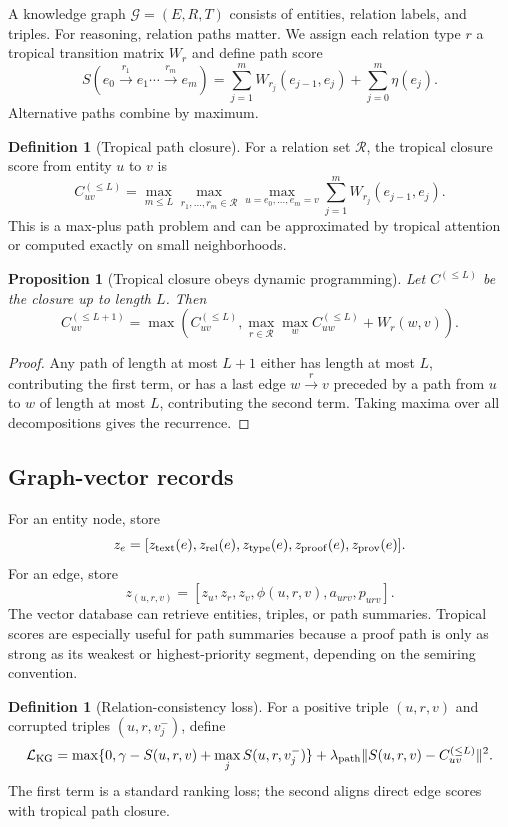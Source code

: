 \documentclass[11pt]{article}
\newtheorem{proposition}[theorem]{Proposition}
\theoremstyle{definition}
\newtheorem{definition}[theorem]{Definition}
\theoremstyle{remark}
\newcommand{\KG}{\mathcal{G}}
\begin{document}
A knowledge graph \(\KG=(E,R,T)\) consists of entities, relation labels, and triples. For reasoning, relation paths matter. We assign each relation type \(r\) a tropical transition matrix \(W_r\) and define path score
\[
    S(e_0\xrightarrow{r_1}e_1\cdots\xrightarrow{r_m}e_m)=\sum_{j=1}^m W_{r_j}(e_{j-1},e_j)+\sum_{j=0}^m \eta(e_j).
\]
Alternative paths combine by maximum.

\begin{definition}[Tropical path closure]
For a relation set \(\mathcal R\), the tropical closure score from entity \(u\) to \(v\) is
\[
    C_{uv}^{(\le L)}=\max_{m\le L}\max_{r_1,\ldots,r_m\in\mathcal R}\max_{u=e_0,\ldots,e_m=v}\sum_{j=1}^m W_{r_j}(e_{j-1},e_j).
\]
This is a max-plus path problem and can be approximated by tropical attention or computed exactly on small neighborhoods.
\end{definition}

\begin{proposition}[Tropical closure obeys dynamic programming]
Let \(C^{(\le L)}\) be the closure up to length \(L\). Then
\[
    C_{uv}^{(\le L+1)}=\max\left(C_{uv}^{(\le L)},\max_{r\in\mathcal R}\max_w C_{uw}^{(\le L)}+W_r(w,v)\right).
\]
\end{proposition}
\begin{proof}
Any path of length at most \(L+1\) either has length at most \(L\), contributing the first term, or has a last edge \(w\xrightarrow{r}v\) preceded by a path from \(u\) to \(w\) of length at most \(L\), contributing the second term. Taking maxima over all decompositions gives the recurrence.
\end{proof}

\subsection{Graph-vector records}

For an entity node, store
\[
    z_e=[z_{\rm text}(e),z_{\rm rel}(e),z_{\rm type}(e),z_{\rm proof}(e),z_{\rm prov}(e)].
\]
For an edge, store
\[
    z_{(u,r,v)}=[z_u,z_r,z_v,\phi(u,r,v),a_{urv},p_{urv}].
\]
The vector database can retrieve entities, triples, or path summaries. Tropical scores are especially useful for path summaries because a proof path is only as strong as its weakest or highest-priority segment, depending on the semiring convention.

\begin{definition}[Relation-consistency loss]
For a positive triple \((u,r,v)\) and corrupted triples \((u,r,v^-_j)\), define
\[
    \mathcal L_{\rm KG}=\max\{0,\gamma-S(u,r,v)+\max_j S(u,r,v^-_j)\}+\lambda_{\rm path}\|S(u,r,v)-C_{uv}^{(\le L)}\|^2.
\]
The first term is a standard ranking loss; the second aligns direct edge scores with tropical path closure.
\end{definition}
\end{document}
